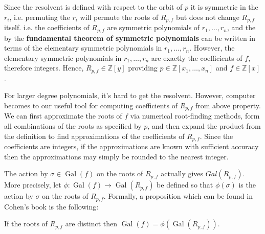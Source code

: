 Since the resolvent is defined with respect to the orbit of $p$ it is symmetric in the $r_i$, i.e. permuting the $r_i$ will permute the roots of $R_{p,f}$ but does not change $R_{p,f}$ itself. i.e. the coefficients of $R_{p,f}$ are symmetric polynomials of $r_1,\dots,r_n$, and the by the \textbf{fundamental theorem of symmetric polynomials} can be written in terms of the elementary symmetric polynomials in $r_1,\dots,r_n$. However, the elementary symmetric polynomials in $r_1,\dots,r_n$ are exactly the coefficients of $f$, therefore integers. Hence, $R_{p,f}\in\mathbb{Z}[y]$ providing $p\in\mathbb{Z}[x_1,\dots,x_n]$ and $f\in\mathbb{Z}[x]$.

For larger degree polynomials, it's hard to get the resolvent. However, computer becomes to our useful tool for computing coefficients of $R_{p,f}$ from above property. We can first approximate the roots of $f$ via numerical root-finding methods, form all combinations of the roots as specified by $p$, and then expand the product from the definition to find approximations of the coefficients of $R_{p,f}$. Since the coefficients are integers, if the approximations are known with sufficient accuracy then the approximations may simply be rounded to the nearest integer.

The action by $\sigma\in\operatorname{Gal}(f)$ on the roots of $R_{p,f}$ actually gives $Gal(R_{p,f})$. More precisely, let $\phi: \operatorname{Gal}(f)\rightarrow \operatorname{Gal}(R_{p,f})$ be defined so that $\phi(\sigma)$ is the action by $\sigma$ on the roots of $R_{p,f}$. Formally, a proposition which can be found in Cohen's book \citep{cohen1993course} is the following:
\begin{proposition}
If the roots of $R_{p,f}$ are distinct then $\operatorname{Gal}(f)=\phi(\operatorname{Gal}(R_{p,f}))$.
\end{proposition}

